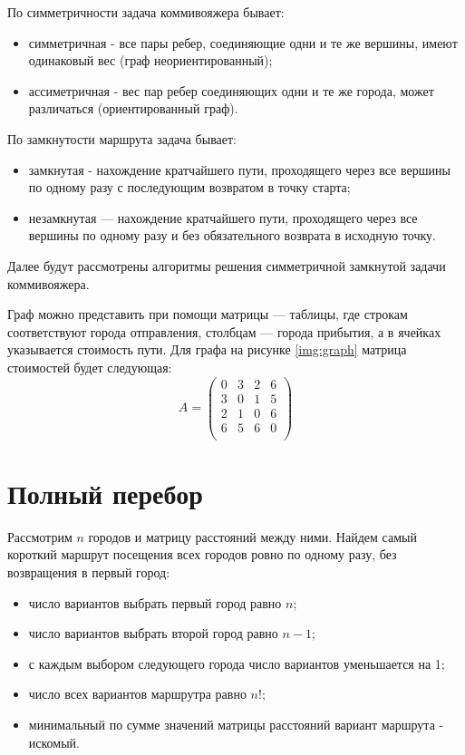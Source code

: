 По симметричности задача коммивояжера бывает:
\begin{itemize}
	\item симметричная - все пары ребер, соединяющие одни и те же вершины, имеют одинаковый вес (граф неориентированный);
	\item ассиметричная - вес пар ребер соединяющих одни и те же города, может различаться (ориентированный граф).
\end{itemize}

По замкнутости маршрута задача бывает: 
\begin{itemize}
	\item замкнутая - нахождение кратчайшего пути, проходящего через все вершины по одному разу с последующим возвратом в точку старта;
	\item незамкнутая — нахождение кратчайшего пути, проходящего через все вершины по одному разу и без обязательного возврата в исходную точку.
\end{itemize}

Далее будут рассмотрены алгоритмы решения симметричной замкнутой задачи коммивояжера.

Граф можно представить при помощи матрицы — таблицы, где строкам соответствуют города отправления, столбцам — города прибытия, а в ячейках указывается стоимость пути. Для графа на рисунке \ref{img:graph} матрица стоимостей будет следующая:
\clearpage
\begin{equation}
	A = \begin{pmatrix}
		0 & 3 & 2 & 6\\
		3 & 0 & 1 & 5\\
		2 & 1 & 0 & 6\\
		6 & 5 & 6 & 0\\
	\end{pmatrix}
\end{equation}

\section{Полный перебор}

Рассмотрим $n$ городов и матрицу расстояний между ними. Найдем самый короткий маршрут посещения всех городов ровно по одному разу, без возвращения в первый город:

\begin{itemize}
	\item число вариантов выбрать первый город равно $n$;
	\item число вариантов выбрать второй город равно $n - 1$;
	\item с каждым выбором следующего города число вариантов уменьшается на 1;
	\item число всех вариантов маршрутра равно $n!$;
	\item минимальный по сумме значений матрицы расстояний вариант маршрута - искомый.
\end{itemize}


